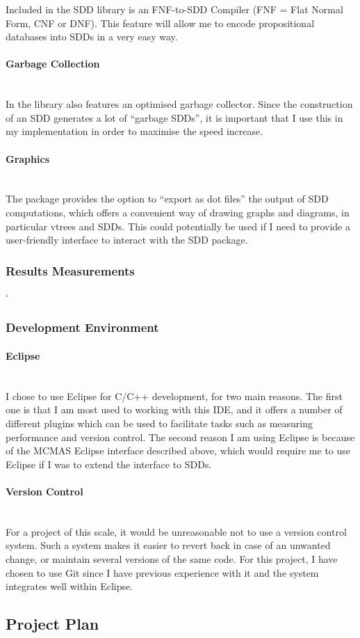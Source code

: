\documentclass{article}
\newcommand{\myparagraph}[1]{\paragraph{#1}\mbox{}\\}
\begin{document}
Included in the SDD library is an FNF-to-SDD Compiler (FNF = Flat Normal Form, CNF or DNF). This feature will allow me to encode propositional databases into SDDs in a very easy way. 

\myparagraph{Garbage Collection}

In the library also features an optimised garbage collector. Since the construction of an SDD generates a lot of ``garbage SDDs'', it is important that I use this in my implementation in order to maximise the speed increase. 

\myparagraph{Graphics}

The package provides the option to ``export as dot files'' the output of SDD computations, which offers a convenient way of drawing graphs and diagrams, in particular vtrees and SDDs.
This could potentially be used if I need to provide a user-friendly interface to interact with the SDD package. 


\subsubsection{Results Measurements}

`

\subsubsection{Development Environment}

\myparagraph{Eclipse}

I chose to use Eclipse for C/C++ development, for two main reasons. 
The first one is that I am most used to working with this IDE, and it offers a number of different plugins which can be used to facilitate tasks such as measuring performance and version control. 
The second reason I am using Eclipse is because of the MCMAS Eclipse interface described above, which would require me to use Eclipse if I was to extend the interface to SDDs. 

\myparagraph{Version Control}

For a project of this scale, it would be unreasonable not to use a version control system. Such a system makes it easier to revert back in case of an unwanted change, or maintain several versions of the same code.  For this project, I have chosen to use Git since I have previous experience with it and the system integrates well within Eclipse. 


\subsection{Project Plan}
\end{document}
